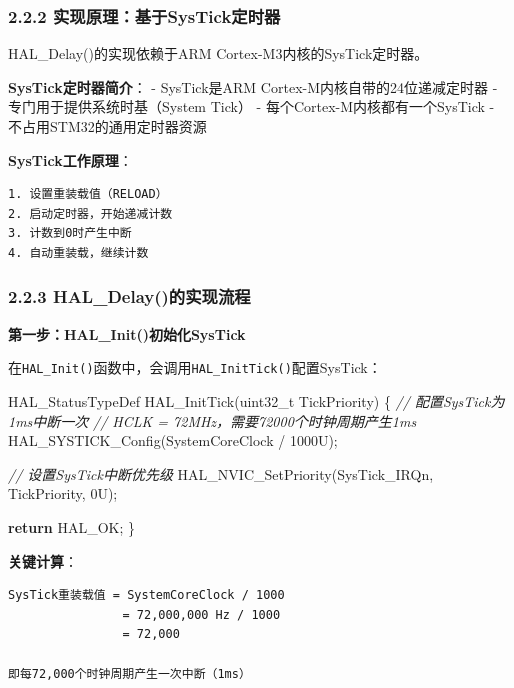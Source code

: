 \documentclass[
  chinese,
  UTF8,
  oneside,
  openany]{ctexbook}
\newenvironment{Shaded}{}{}
\newcommand{\BuiltInTok}[1]{\textcolor[rgb]{0.00,0.50,0.00}{#1}}
\newcommand{\CommentTok}[1]{\textcolor[rgb]{0.38,0.63,0.69}{\textit{#1}}}
\newcommand{\ControlFlowTok}[1]{\textcolor[rgb]{0.00,0.44,0.13}{\textbf{#1}}}
\newcommand{\DataTypeTok}[1]{\textcolor[rgb]{0.56,0.13,0.00}{#1}}
\newcommand{\DecValTok}[1]{\textcolor[rgb]{0.25,0.63,0.44}{#1}}
\newcommand{\NormalTok}[1]{#1}
\newcommand{\OperatorTok}[1]{\textcolor[rgb]{0.40,0.40,0.40}{#1}}
\begin{document}
\subsubsection{2.2.2
实现原理：基于SysTick定时器}\label{ux5b9eux73b0ux539fux7406ux57faux4e8esystickux5b9aux65f6ux5668}

HAL\_Delay()的实现依赖于ARM Cortex-M3内核的SysTick定时器。

\textbf{SysTick定时器简介}： - SysTick是ARM
Cortex-M内核自带的24位递减定时器 - 专门用于提供系统时基（System Tick） -
每个Cortex-M内核都有一个SysTick - 不占用STM32的通用定时器资源

\textbf{SysTick工作原理}：

\begin{verbatim}
1. 设置重装载值（RELOAD）
2. 启动定时器，开始递减计数
3. 计数到0时产生中断
4. 自动重装载，继续计数
\end{verbatim}

\subsubsection{2.2.3
HAL\_Delay()的实现流程}\label{hal_delayux7684ux5b9eux73b0ux6d41ux7a0b}

\textbf{第一步：HAL\_Init()初始化SysTick}

在\texttt{HAL\_Init()}函数中，会调用\texttt{HAL\_InitTick()}配置SysTick：

\begin{Shaded}
\begin{Highlighting}[]
\NormalTok{HAL\_StatusTypeDef HAL\_InitTick}\OperatorTok{(}\DataTypeTok{uint32\_t}\NormalTok{ TickPriority}\OperatorTok{)}
\OperatorTok{\{}
  \CommentTok{// 配置SysTick为1ms中断一次}
  \CommentTok{// HCLK = 72MHz，需要72000个时钟周期产生1ms}
\NormalTok{  HAL\_SYSTICK\_Config}\OperatorTok{(}\NormalTok{SystemCoreClock }\OperatorTok{/} \DecValTok{1000}\BuiltInTok{U}\OperatorTok{);}
  
  \CommentTok{// 设置SysTick中断优先级}
\NormalTok{  HAL\_NVIC\_SetPriority}\OperatorTok{(}\NormalTok{SysTick\_IRQn}\OperatorTok{,}\NormalTok{ TickPriority}\OperatorTok{,} \DecValTok{0}\BuiltInTok{U}\OperatorTok{);}
  
  \ControlFlowTok{return}\NormalTok{ HAL\_OK}\OperatorTok{;}
\OperatorTok{\}}
\end{Highlighting}
\end{Shaded}

\textbf{关键计算}：

\begin{verbatim}
SysTick重装载值 = SystemCoreClock / 1000
                = 72,000,000 Hz / 1000
                = 72,000

即每72,000个时钟周期产生一次中断（1ms）
\end{verbatim}
\end{document}
